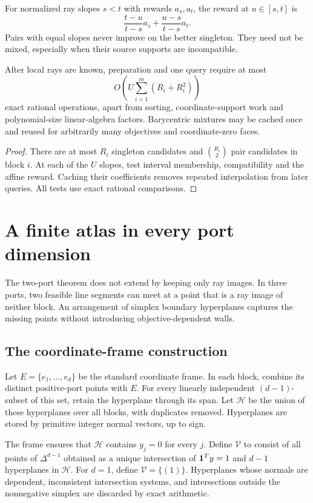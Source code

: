 For normalized ray slopes $s<t$ with rewards $a_s,a_t$, the reward at $u\in[s,t]$ is
\[
 \frac{t-u}{t-s}a_s+\frac{u-s}{t-s}a_t.
\]
Pairs with equal slopes never improve on the better singleton. They need not be mixed, especially when their source supports are incompatible.

\begin{corollary}
\label{cor:two-cost}
After local rays are known, preparation and one query require at most
\[
 O\!\left(U\sum_{i=1}^m(R_i+R_i^2)\right)
\]
exact rational operations, apart from sorting, coordinate-support work and polynomial-size linear-algebra factors. Barycentric mixtures may be cached once and reused for arbitrarily many objectives and coordinate-zero faces.
\end{corollary}
\begin{proof}
There are at most $R_i$ singleton candidates and $\binom{R_i}{2}$ pair candidates in block $i$. At each of the $U$ slopes, test interval membership, compatibility and the affine reward. Caching their coefficients removes repeated interpolation from later queries. All tests use exact rational comparisons.
\end{proof}

\section{A finite atlas in every port dimension}
\label{sec:atlas}
The two-port theorem does not extend by keeping only ray images. In three ports, two feasible line segments can meet at a point that is a ray image of neither block. An arrangement of simplex boundary hyperplanes captures the missing points without introducing objective-dependent walls.

\subsection{The coordinate-frame construction}
Let $E=\{e_1,\ldots,e_d\}$ be the standard coordinate frame. In each block, combine its distinct positive-port points with $E$. For every linearly independent $(d-1)$-subset of this set, retain the hyperplane through its span. Let $\mathcal H$ be the union of these hyperplanes over all blocks, with duplicates removed. Hyperplanes are stored by primitive integer normal vectors, up to sign.

The frame ensures that $\mathcal H$ contains $y_j=0$ for every $j$. Define $\mathcal V$ to consist of all points of $\Delta^{d-1}$ obtained as a unique intersection of $\mathbf1^Ty=1$ and $d-1$ hyperplanes in $\mathcal H$. For $d=1$, define $\mathcal V=\{(1)\}$. Hyperplanes whose normals are dependent, inconsistent intersection systems, and intersections outside the nonnegative simplex are discarded by exact arithmetic.

